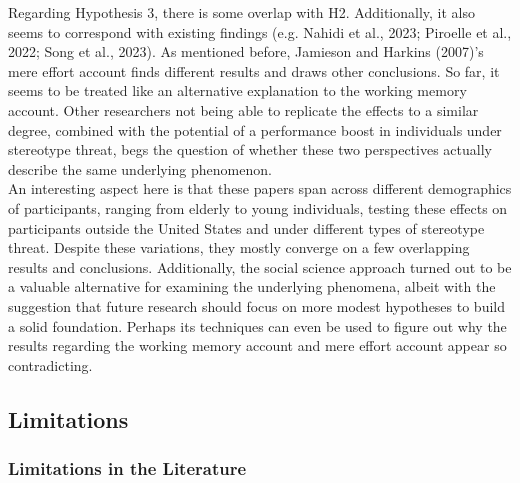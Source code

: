 \documentclass[
  stu, a4paper,floatsintext]{apa7}
\begin{document}
Regarding Hypothesis 3, there is some overlap with H2. Additionally, it also seems to correspond with existing findings (e.g. Nahidi et al., 2023; Piroelle et al., 2022; Song et al., 2023).
As mentioned before, Jamieson and Harkins (2007)'s mere effort account finds different results and draws other conclusions.
So far, it seems to be treated like an alternative explanation to the working memory account.
Other researchers not being able to replicate the effects to a similar degree, combined with the potential of a performance boost in individuals under stereotype threat, begs the question of whether these two perspectives actually describe the same underlying phenomenon.\\
An interesting aspect here is that these papers span across different demographics of participants, ranging from elderly to young individuals, testing these effects on participants outside the United States and under different types of stereotype threat.
Despite these variations, they mostly converge on a few overlapping results and conclusions.
Additionally, the social science approach turned out to be a valuable alternative for examining the underlying phenomena, albeit with the suggestion that future research should focus on more modest hypotheses to build a solid foundation.
Perhaps its techniques can even be used to figure out why the results regarding the working memory account and mere effort account appear so contradicting.

\subsection{Limitations}\label{limitations}

\subsubsection{Limitations in the Literature}\label{limitations-in-the-literature}
\end{document}
